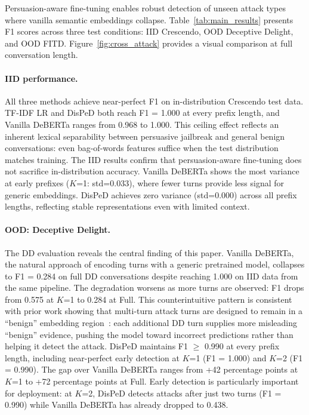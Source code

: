 Persuasion-aware fine-tuning enables robust detection of unseen attack types where vanilla semantic embeddings collapse.
Table~\ref{tab:main_results} presents F1 scores across three test conditions: IID Crescendo, OOD Deceptive Delight, and OOD FITD.
Figure~\ref{fig:cross_attack} provides a visual comparison at full conversation length.

\paragraph{IID performance.}
All three methods achieve near-perfect F1 on in-distribution Crescendo test data.
TF-IDF LR and DisPeD both reach F1 = 1.000 at every prefix length, and Vanilla DeBERTa ranges from 0.968 to 1.000.
This ceiling effect reflects an inherent lexical separability between persuasive jailbreak and general benign conversations: even bag-of-words features suffice when the test distribution matches training.
The IID results confirm that persuasion-aware fine-tuning does not sacrifice in-distribution accuracy.
Vanilla DeBERTa shows the most variance at early prefixes ($K$=1: std=0.033), where fewer turns provide less signal for generic embeddings.
DisPeD achieves zero variance (std=0.000) across all prefix lengths, reflecting stable representations even with limited context.

\paragraph{OOD: Deceptive Delight.}
The DD evaluation reveals the central finding of this paper.
Vanilla DeBERTa, the natural approach of encoding turns with a generic pretrained model, collapses to F1 = 0.284 on full DD conversations despite reaching 1.000 on IID data from the same pipeline.
The degradation worsens as more turns are observed: F1 drops from 0.575 at $K$=1 to 0.284 at Full.
This counterintuitive pattern is consistent with prior work showing that multi-turn attack turns are designed to remain in a ``benign'' embedding region~\citep{bullwinkel2025repeng}: each additional DD turn supplies more misleading ``benign'' evidence, pushing the model toward incorrect predictions rather than helping it detect the attack.
DisPeD maintains F1 $\geq$ 0.990 at every prefix length, including near-perfect early detection at $K$=1 (F1 = 1.000) and $K$=2 (F1 = 0.990).
The gap over Vanilla DeBERTa ranges from +42 percentage points at $K$=1 to +72 percentage points at Full.
Early detection is particularly important for deployment: at $K$=2, DisPeD detects attacks after just two turns (F1 = 0.990) while Vanilla DeBERTa has already dropped to 0.438.

